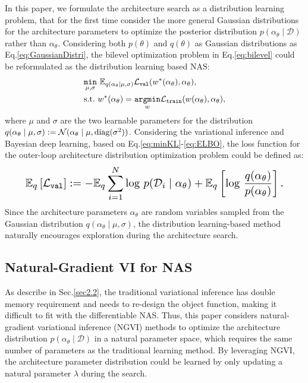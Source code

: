 \documentclass[10pt,twocolumn,letterpaper]{article}
\begin{document}
In this paper, we formulate the architecture search as a distribution learning problem, that for the first time consider the more general Gaussian distributions for the architecture parameters to optimize the posterior distribution $p(\alpha_\theta \mid \mathcal{D})$ rather than $\alpha_\theta$. Considering both $p(\theta)$ and $q(\theta)$ as Gaussian distributions as Eq.\eqref{eq:GaussianDistri}, the bilevel optimization problem in Eq.\eqref{eq:bilevel} could be reformulated as the distribution learning based NAS:
\begin{equation} \label{eq:distri_lear}
\begin{aligned}
&\underset{\mu,\sigma }{\mathtt{min}} \ \mathbb{E}_{q(\alpha_\theta \mid \mu,\sigma )} \mathcal{L}_{\mathtt{val}}(w^*(\alpha_\theta),\alpha_\theta), \\
&\textup{s.t.}\ w^*(\alpha_\theta)=\underset{w}{\mathtt{argmin}} \mathcal{L}_{\mathtt{train}}(w(\alpha_\theta),\alpha_\theta),
\end{aligned}
\end{equation}
where $\mu$ and $\sigma$ are the two learnable parameters for the distribution $q(\alpha_\theta \mid \mu,\sigma ):=\mathcal{N}(\alpha_\theta \mid \mu, \textup{diag}(\sigma ^2))$. Considering the variational inference and Bayesian deep learning, based on Eq.\eqref{eq:minKL}-\eqref{eq:ELBO}, the loss function for the outer-loop architecture distribution optimization problem could be defined as:
\begin{equation} \label{eq:ELBO_darts}
\resizebox{.9\linewidth}{!}{$
    \displaystyle
\mathbb{E}_{q} \left [\mathcal{L}_{\mathtt{val}}\right ]:=-\mathbb{E}_q \sum_{i=1}^{N}  \textup{log}\ p(\mathcal{D}_i \mid \alpha_\theta)+ \mathbb{E}_q \left [ \textup{log}\ \frac{q(\alpha_\theta)}{p(\alpha_\theta)} \right ].
$}
\end{equation}
Since the architecture parameters $\alpha_\theta$ are random variables sampled from the Gaussian distribution $q(\alpha_\theta \mid \mu,\sigma )$, the distribution learning-based method naturally encourages exploration during the architecture search.




\subsection{Natural-Gradient VI for NAS}
\label{sec3.2}

As describe in Sec.\ref{sec2.2}, the traditional variational inference has double memory requirement and needs to re-design the object function, making it difficult to fit with the differentiable NAS. Thus, this paper considers natural-gradient variational inference (NGVI) methods \cite{khan2018fast,osawa2019practical} to optimize the architecture distribution $p(\alpha_\theta \mid \mathcal{D})$ in a natural parameter space, which requires the same number of parameters as the traditional learning method. By leveraging NGVI, the architecture parameter distribution could be learned by only updating a natural parameter $\lambda$ during the search. 
\end{document}

